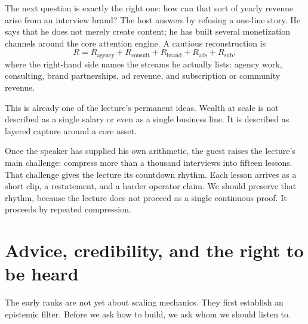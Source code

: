 The next question is exactly the right one: how can that sort of yearly revenue arise from an interview brand? The host answers by refusing a one-line story. He says that he does not merely create content; he has built several monetization channels around the core attention engine. A cautious reconstruction is
\begin{equation}
R = R_{\mathrm{agency}} + R_{\mathrm{consult}} + R_{\mathrm{brand}} + R_{\mathrm{ads}} + R_{\mathrm{sub}},
\end{equation}
where the right-hand side names the streams he actually lists: agency work, consulting, brand partnerships, ad revenue, and subscription or community revenue.

This is already one of the lecture's permanent ideas. Wealth at scale is not described as a single salary or even as a single business line. It is described as layered capture around a core asset.

\begin{figure}[h]
\centering
{}
\end{figure}

Once the speaker has supplied his own arithmetic, the guest raises the lecture's main challenge: compress more than a thousand interviews into fifteen lessons. That challenge gives the lecture its countdown rhythm. Each lesson arrives as a short clip, a restatement, and a harder operator claim. We should preserve that rhythm, because the lecture does not proceed as a single continuous proof. It proceeds by repeated compression.

\section{Advice, credibility, and the right to be heard}

The early ranks are not yet about scaling mechanics. They first establish an epistemic filter. Before we ask how to build, we ask whom we should listen to.


